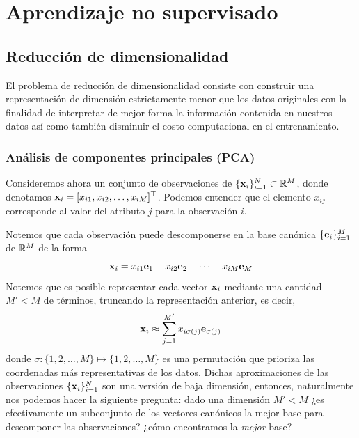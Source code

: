 
\section{Aprendizaje no supervisado}

\subsection{Reducción de dimensionalidad}

El problema de reducción de dimensionalidad consiste con construir una representación de dimensión estrictamente menor que los datos originales con la finalidad de interpretar de mejor forma la información contenida en nuestros datos así como también disminuir el costo computacional en el entrenamiento.

\subsubsection{Análisis de componentes principales (PCA)}

Consideremos ahora un conjunto de observaciones de $\{\mathbf{x}_i\}_{i=1}^N\subset\mathbb{R}^M$, donde denotamos $\mathbf{x}_i=[x_{i1},x_{i2},\ldots,x_{iM}]^\top$. Podemos entender que el elemento $x_{ij}$ corresponde al valor del atributo $j$ para la observación $i$. 

Notemos que cada observación puede descomponerse en la base canónica $\{\mathbf{e}_i\}_{i=1}^M$ de $\mathbb{R}^M$ de la forma 
\begin{equation}
	\mathbf{x}_i = x_{i1}\mathbf{e}_1 +  x_{i2}\mathbf{e}_2 + \cdots + x_{iM}\mathbf{e}_M 		
\end{equation}
Notemos que es posible representar cada vector $\mathbf{x}_i$ mediante una cantidad $M'<M$ de términos, truncando la representación anterior, es decir,  
\begin{equation}
	\mathbf{x}_i \approx \sum_{j=1}^{M'} x_{i\sigma(j)}\mathbf{e}_{\sigma(j)}
\end{equation}
donde $\sigma:\{1,2,\ldots,M\}\mapsto\{1,2,\ldots,M\}$ es una permutación que prioriza las coordenadas más representativas de los datos. Dichas aproximaciones de las observaciones $\{\mathbf{x}_i\}_{i=1}^N$ son una versión de baja dimensión, entonces, naturalmente nos podemos hacer la siguiente pregunta: dado una dimensión $M'<M$  ¿es efectivamente un subconjunto de los vectores canónicos la mejor base para descomponer las observaciones?  ¿cómo encontramos la \emph{mejor} base?


